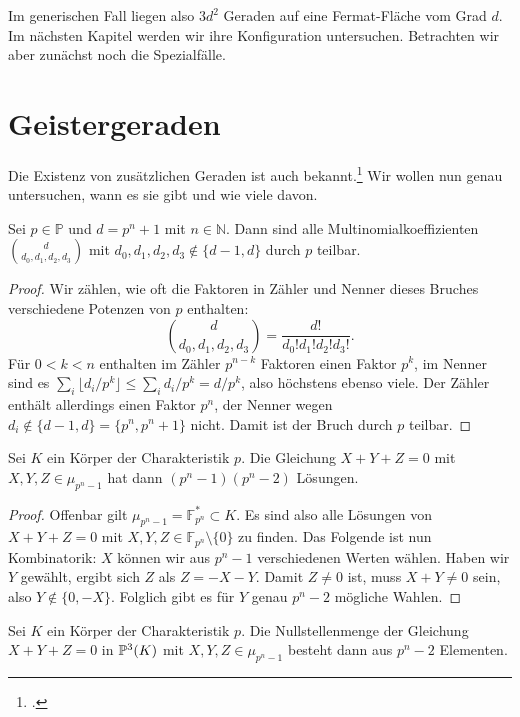 Im generischen Fall liegen also $3d^2$ Geraden auf eine Fermat-Fläche vom Grad $d$. Im nächsten Kapitel werden wir ihre Konfiguration untersuchen. Betrachten wir aber zunächst noch die Spezialfälle.

\section{Geistergeraden}
Die Existenz von zusätzlichen Geraden ist auch bekannt.\footcite[siehe][S.~14f]{LinesOnFermat} Wir wollen nun genau untersuchen, wann es sie gibt und wie viele davon.
\begin{prop}
Sei $p \in \mathbb P$ und $d = p^n+1$ mit $n \in \mathbb N$. Dann sind alle Multinomialkoeffizienten $\binom d{d_0,d_1,d_2,d_3}$ mit $d_0, d_1, d_2, d_3 \not\in \{d-1, d\}$ durch $p$ teilbar.
\end{prop}
\begin{proof}
Wir zählen, wie oft die Faktoren in Zähler und Nenner dieses Bruches verschiedene Potenzen von $p$ enthalten:
\begin{equation*}
\binom d{d_0,d_1,d_2,d_3} = \frac{d!}{d_0! d_1! d_2! d_3!}.
\end{equation*}
Für $0 < k < n$ enthalten im Zähler $p^{n-k}$ Faktoren einen Faktor $p^k$, im Nenner sind es $\sum_i \lfloor d_i/p^k \rfloor \leq \sum_i d_i/p^k = d/p^k$, also höchstens ebenso viele. Der Zähler enthält allerdings einen Faktor $p^n$, der Nenner wegen $d_i \not\in \{d-1, d\} = \{p^n, p^n+1\}$ nicht. Damit ist der Bruch durch $p$ teilbar.
\end{proof}

\begin{lemma}
Sei $K$ ein Körper der Charakteristik $p$. Die Gleichung $X+Y+Z=0$ mit $X,Y,Z \in \mu_{p^n-1}$ hat dann $(p^n-1)(p^n-2)$ Lösungen.
\end{lemma}
\begin{proof}
Offenbar gilt $\mu_{p^n-1} = \mathbb F_{p^n}^* \subset K$. Es sind also alle Lösungen von $X+Y+Z=0$ mit $X,Y,Z \in \mathbb F_{p^n} \setminus \{0\}$ zu finden. Das Folgende ist nun Kombinatorik: $X$ können wir aus $p^n-1$ verschiedenen Werten wählen. Haben wir $Y$ gewählt, ergibt sich $Z$ als $Z=-X-Y$. Damit $Z \neq 0$ ist, muss $X+Y \neq 0$ sein, also $Y \not\in \{0,-X\}$. Folglich gibt es für $Y$ genau $p^n-2$ mögliche Wahlen.
\end{proof}
\begin{coroll} \label{cor:projrootsum}
Sei $K$ ein Körper der Charakteristik $p$. Die Nullstellenmenge der Gleichung $X+Y+Z=0$ in $\mathbb P^{3}(K)$ mit $X,Y,Z \in \mu_{p^n-1}$ besteht dann aus $p^n-2$ Elementen.
\end{coroll}


